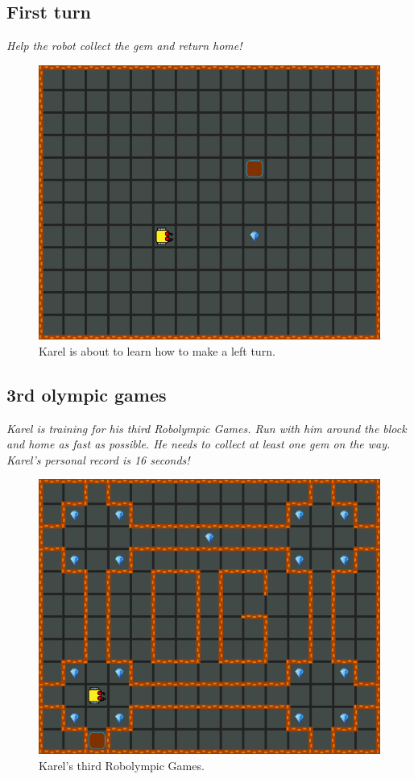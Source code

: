 \subsection{First turn}

{\em Help the robot collect the gem and return home!}

\begin{figure}[!ht]
\begin{center}
\includegraphics[height=0.4\textwidth]{img/a05.png}
\end{center}
\vspace{-4mm}
\caption{Karel is about to learn how to make a left turn.}
\label{fig:a05}
\vspace{-1cm}
\end{figure}
\noindent


\subsection{3rd olympic games}

{\em Karel is training for his third Robolympic Games. Run with him around the block and home as fast as possible. He needs to collect at least one gem on the way. Karel's personal record is 16 seconds!}

\begin{figure}[!ht]
\begin{center}
\includegraphics[height=0.4\textwidth]{img/a06.png}
\end{center}
\vspace{-4mm}
\caption{Karel's third Robolympic Games.}
\label{fig:a06}
\vspace{-1cm}
\end{figure}
\noindent


